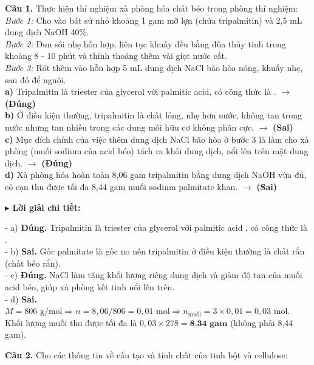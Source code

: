 \documentclass[11pt,a4paper]{article}
\newcommand{\loigiai}[1]{
    \par\vspace{2pt}
    \begingroup\leftskip=12pt
    \textcolor{solBlue}{\textbf{$\blacktriangleright$ Lời giải chi tiết:}}\par
    \small #1
    \par\endgroup\vspace{3pt}
}
\begin{document}
\textbf{Câu 1.} Thực hiện thí nghiệm xà phòng hóa chất béo trong phòng thí nghiệm:\\
\textit{Bước 1:} Cho vào bát sứ nhỏ khoảng 1 gam mỡ lợn (chứa tripalmitin) và 2,5 mL dung dịch NaOH 40\%.\\
\textit{Bước 2:} Đun sôi nhẹ hỗn hợp, liên tục khuấy đều bằng đũa thủy tinh trong khoảng 8 - 10 phút và thỉnh thoảng thêm vài giọt nước cất.\\
\textit{Bước 3:} Rót thêm vào hỗn hợp 5 mL dung dịch NaCl bão hòa nóng, khuấy nhẹ, sau đó để nguội.\\[2pt]

\quad \textbf{a)} Tripalmitin là triester của glycerol với palmitic acid, có công thức là . \quad $\to$ \textbf{\color{ansRed}(Đúng)}\\[2pt]
\quad \textbf{b)} Ở điều kiện thường, tripalmitin là chất lỏng, nhẹ hơn nước, không tan trong nước nhưng tan nhiều trong các dung môi hữu cơ không phân cực. \quad $\to$ \textbf{\color{ansRed}(Sai)}\\[2pt]
\quad \textbf{c)} Mục đích chính của việc thêm dung dịch NaCl bão hòa ở bước 3 là làm cho xà phòng (muối sodium của acid béo) tách ra khỏi dung dịch, nổi lên trên mặt dung dịch. \quad $\to$ \textbf{\color{ansRed}(Đúng)}\\[2pt]
\quad \textbf{d)} Xà phòng hóa hoàn toàn 8,06 gam tripalmitin bằng dung dịch NaOH vừa đủ, cô cạn thu được tối đa 8,44 gam muối sodium palmitate khan. \quad $\to$ \textbf{\color{ansRed}(Sai)}\\[2pt]
\loigiai{- a) \textbf{Đúng.} Tripalmitin là triester của glycerol với palmitic acid \ce{C15H31COOH}, có công thức là \ce{(C15H31COO)3C3H5}.\\
- b) \textbf{Sai.} Gốc palmitate là gốc no nên tripalmitin ở điều kiện thường là chất rắn (chất béo rắn).\\
- c) \textbf{Đúng.} NaCl làm tăng khối lượng riêng dung dịch và giảm độ tan của muối acid béo, giúp xà phòng kết tinh nổi lên trên.\\
- d) \textbf{Sai.} $M = 806\text{ g/mol} \Rightarrow n = 8,06 / 806 = 0,01\text{ mol} \Rightarrow n_{\text{muối}} = 3 \times 0,01 = 0,03\text{ mol}$.\\
Khối lượng muối thu được tối đa là $0,03 \times 278 = \textbf{8,34 gam}$ (không phải 8,44 gam).}
\vspace{4pt}
\textbf{Câu 2.} Cho các thông tin về cấu tạo và tính chất của tinh bột và cellulose:\\[2pt]
\end{document}
